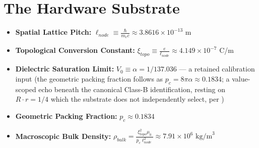 \section{The Hardware Substrate}
\begin{itemize}
    \item \textbf{Spatial Lattice Pitch:} $\ell_{node} \equiv \frac{\hbar}{m_e c} \approx 3.8616 \times 10^{-13}$ m
    \item \textbf{Topological Conversion Constant:} $\xi_{topo} \equiv \frac{e}{\ell_{node}} \approx 4.149 \times 10^{-7}$ C/m
    \item \textbf{Dielectric Saturation Limit:} $V_0 \equiv \alpha = 1/137.036$ --- a retained calibration input (the geometric packing fraction follows as $p_c = 8\pi\alpha \approx 0.1834$; a value-scoped echo beneath the canonical Class-B identification, resting on $R\cdot r = 1/4$ which the substrate does not independently select, per )
    \item \textbf{Geometric Packing Fraction:} $p_c \approx 0.1834$
    \item \textbf{Macroscopic Bulk Density:} $\rho_{bulk} = \frac{\xi_{topo}^2 \mu_0}{p_c \ell_{node}^2} \approx 7.91 \times 10^6 \text{ kg/m}^3$

\end{itemize}
